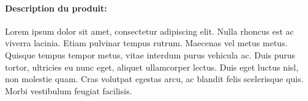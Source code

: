 \documentclass[a4paper,10pt]{article}
\begin{document}
\vspace{\rsfbespaceVertical}




\begin{xcalctab}
\normalfont




\end{xcalctab}



\vspace{\rsfbespaceVertical}


\paragraph*{Description du produit:}
 Lorem ipsum dolor sit amet, consectetur adipiscing elit. Nulla rhoncus est ac viverra lacinia. Etiam pulvinar tempus rutrum. Maecenas vel metus metus. Quisque tempus tempor metus, vitae interdum purus vehicula ac. Duis purus tortor, ultricies eu nunc eget, aliquet ullamcorper lectus. Duis eget luctus nisl, non molestie quam. Cras volutpat egestas arcu, ac blandit felis scelerisque quis. Morbi vestibulum feugiat facilisis.
\end{document}
